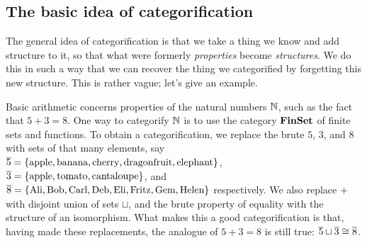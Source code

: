 \documentclass[7Sketches]{subfiles}
\begin{document}
\subsection{The basic idea of categorification}

The general idea of categorification is that we take a thing we know and
add structure to it, so that what were formerly \emph{properties} become
\emph{structures}. We do this in such a way that we can recover the thing we
categorified by forgetting this new structure. This is rather vague; let's give
an example.%

Basic arithmetic concerns properties of the natural numbers $\mathbb{N}$, such as the
fact that $5+3=8$. One way to categorify $\mathbb{N}$ is to use the category
$\mathbf{FinSet}$ of finite sets and functions. To obtain a categorification, we replace
the brute $5$, $3$, and $8$ with sets of that many elements, say
$\overline{5}=\{\textrm{apple}, \textrm{banana}, \textrm{cherry},
\textrm{dragonfruit}, \textrm{elephant}\}$, $\overline{3}=\{\textrm{apple},
\textrm{tomato}, \textrm{cantaloupe}\}$, and $\overline{8}=\{\textrm{Ali},
\textrm{Bob}, \textrm{Carl}, \textrm{Deb}, \textrm{Eli}, \textrm{Fritz},
\textrm{Gem}, \textrm{Helen}\}$ respectively. We also replace $+$ with disjoint
union of sets $\sqcup$, and the brute property of equality with the structure of
an isomorphism. What makes this a good categorification is that, having made
these replacements, the analogue of $5+3=8$ is still true: $\overline{5}\sqcup \overline{3}
\cong \overline{8}$.%
\end{document}
